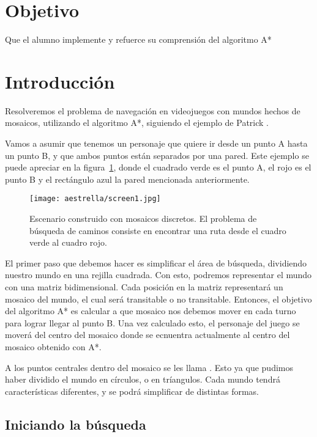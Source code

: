 
\section{Objetivo}
Que el alumno implemente y refuerce su comprensión del algoritmo A* \par

\section{Introducci\'on}

Resolveremos el problema de navegación en videojuegos con mundos hechos de mosaicos, utilizando el algoritmo A*, siguiendo el ejemplo de Patrick \cite{Lester2003}.

Vamos a asumir que tenemos un personaje que quiere ir desde un punto A hasta un punto B, y que ambos puntos están separados por una pared. Este ejemplo se puede apreciar en la figura~\ref{fig:fig1P4}, donde el cuadrado verde es el punto A, el rojo es el punto B y el rectángulo azul la pared mencionada anteriormente.

\begin{figure}
  \centering
  \texttt{[image: aestrella/screen1.jpg]}
  \caption{Escenario construido con mosaicos discretos. El problema de búsqueda de caminos consiste en encontrar una ruta desde el cuadro verde al cuadro rojo.}
  \label{fig:fig1P4}
\end{figure}

El primer paso que debemos hacer es simplificar el área de búsqueda, dividiendo nuestro mundo en una rejilla cuadrada. Con esto, podremos representar el mundo con una matriz bidimensional. Cada posición en la matriz representará un mosaico del mundo, el cual será transitable o no transitable. Entonces, el objetivo del algoritmo A* es calcular a que mosaico nos debemos mover en cada turno para lograr llegar al punto B. Una vez calculado esto, el personaje del juego se moverá del centro del mosaico donde se ecnuentra actualmente al centro del mosaico obtenido con A*.

A los puntos centrales dentro del mosaico se les llama . Esto ya que pudimos haber dividido el mundo en círculos, o en tríangulos. Cada mundo tendrá características diferentes, y se podrá simplificar de distintas formas.

\subsection{Iniciando la b\'usqueda}

